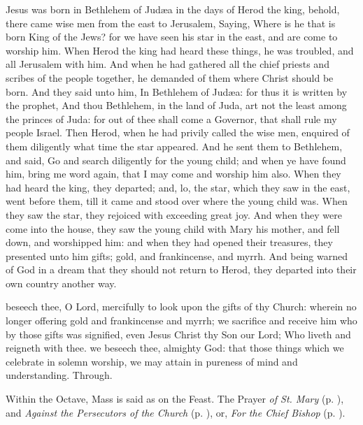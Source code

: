 
 Jesus was born in Bethlehem of Jud{\ae}a in the days of Herod the king, behold, there came wise men from the east to Jerusalem, Saying, Where is he that is born King of the Jews? for we have seen his star in the east, and are come to worship him. When Herod the king had heard these things, he was troubled, and all Jerusalem with him. And when he had gathered all the chief priests and scribes of the people together, he demanded of them where Christ should be born. And they said unto him, In Bethlehem of Jud{\ae}a: for thus it is written by the prophet, And thou Bethlehem, in the land of Juda, art not the least among the princes of Juda: for out of thee shall come a Governor, that shall rule my people Israel. Then Herod, when he had privily called the wise men, enquired of them diligently what time the star appeared. And he sent them to Bethlehem, and said, Go and search diligently for the young child; and when ye have found him, bring me word again, that I may come and worship him also. When they had heard the king, they departed; and, lo, the star, which they saw in the east, went before them, till it came and stood over where the young child was. When they saw the star, they rejoiced with exceeding great joy. And when they were come into the house, they saw the young child with Mary his mother,  and fell down, and worshipped him: and when they had opened their treasures, they presented unto him gifts; gold, and frankincense, and myrrh. And being warned of God in a dream that they should not return to Herod, they departed into their own country another way.

\secret
{} beseech thee, O Lord, mercifully to look upon the gifts of thy Church: wherein no longer offering gold and frankincense and myrrh; we sacrifice and receive him who by those gifts was signified, even Jesus Christ thy Son our Lord; Who liveth and reigneth with thee.
\postcommunion
{} we beseech thee, almighty God: that those things which we celebrate in solemn worship, we may attain in pureness of mind and understanding. Through.
\begin{rubric}
    Within the Octave, Mass is said as on the Feast. The  Prayer \emph{of St. Mary} (p. \pageref{SPMaryPostChristmas}), and  \emph{Against the Persecutors of the Church} (p. \pageref{SPAgainst}), or, \emph{For the Chief Bishop} (p. \pageref{SPChiefBishop}).
\end{rubric}

